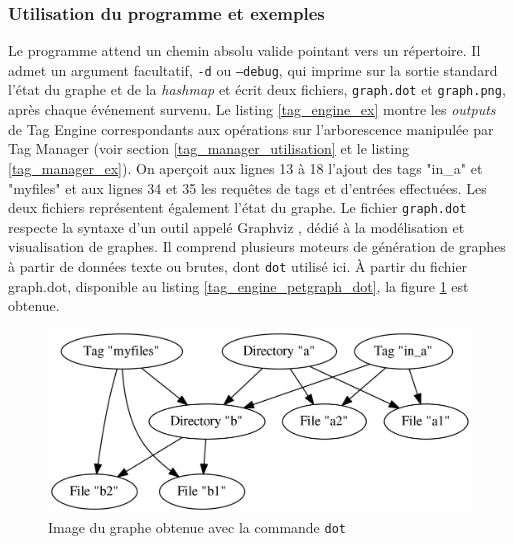 \subsubsection{Utilisation du programme et exemples}
Le programme attend un chemin absolu valide pointant vers un répertoire. Il admet un argument 
facultatif, \texttt{-d} ou \texttt{--debug}, qui imprime sur la sortie 
standard l'état du graphe et de la \textit{hashmap} et écrit deux fichiers, \texttt{graph.dot} 
et \texttt{graph.png}, après chaque événement survenu. Le listing \ref{tag_engine_ex} montre les 
\textit{outputs} de Tag Engine correspondants aux opérations sur l'arborescence manipulée par 
Tag Manager (voir section \ref{tag_manager_utilisation} et le listing \ref{tag_manager_ex}). 
On aperçoit aux lignes 13 à 18 l'ajout des tags "in\_a" et "myfiles" et aux lignes 34 et 35 les 
requêtes de tags et d'entrées effectuées.
Les deux fichiers représentent également l'état du graphe. Le fichier \texttt{graph.dot} 
respecte la syntaxe d'un outil appelé Graphviz \cite{ref50}, dédié à la modélisation et visualisation 
de graphes. Il comprend plusieurs moteurs de génération de graphes à partir de données texte ou 
brutes, dont \texttt{dot} utilisé ici. À partir du fichier graph.dot, disponible au 
listing \ref{tag_engine_petgraph_dot}, la figure \ref{tag_engine_petgraph_dot_image} est obtenue. 
\bigbreak
{}
\bigbreak
\bigbreak
{}
\bigbreak
\begin{figure}
    \begin{center}
        \includegraphics[width=1\textwidth]{images/graph.png}
    \end{center}
    \caption{Image du graphe obtenue avec la commande \texttt{dot}}
    \label{tag_engine_petgraph_dot_image}
\end{figure}